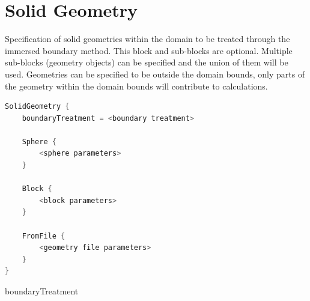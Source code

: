 \section{Solid Geometry}
Specification of solid geometries within the domain to be treated through the immersed boundary method. This block and sub-blocks are optional. Multiple sub-blocks (geometry objects) can be specified and the union of them will be used. Geometries can be specified to be outside the domain bounds, only parts of the geometry within the domain bounds will contribute to calculations.

\begin{lstlisting}[language=C++]
SolidGeometry {
    boundaryTreatment = <boundary treatment>

    Sphere {
        <sphere parameters>
    }

    Block {
        <block parameters>
    }

    FromFile {
        <geometry file parameters>
    }
}
\end{lstlisting}

boundaryTreatment
\vspace{\the\parameterListSpacing}


